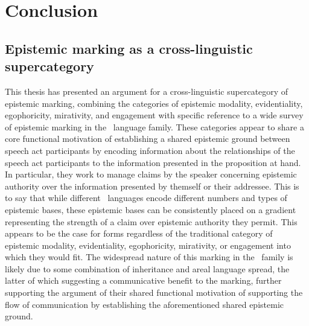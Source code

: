 \chapter{Conclusion}\label{c:Conclusion}
\section{Epistemic marking as a cross-linguistic supercategory}
This thesis has presented an argument for a cross-linguistic supercategory of epistemic marking, combining the categories of epistemic modality, evidentiality, egophoricity, mirativity, and engagement with specific reference to a wide survey of epistemic marking in the \lfam\ language family. These categories appear to share a core functional motivation of establishing a shared epistemic ground between speech act participants by encoding information about the relationships of the speech act participants to the information presented in the proposition at hand. In particular, they work to manage claims by the speaker concerning epistemic authority over the information presented by themself or their addressee. This is to say that while different \lfam\ languages encode different numbers and types of epistemic bases, these epistemic bases can be consistently placed on a gradient representing the strength of a claim over epistemic authority they permit. This appears to be the case for forms regardless of the traditional category of epistemic modality, evidentiality, egophoricity, mirativity, or engagement into which they would fit. The widespread nature of this marking in the \lfam\ family is likely due to some combination of inheritance and areal language spread, the latter of which suggesting a communicative benefit to the marking, further supporting the argument of their shared functional motivation of supporting the flow of communication by establishing the aforementioned shared epistemic ground.

